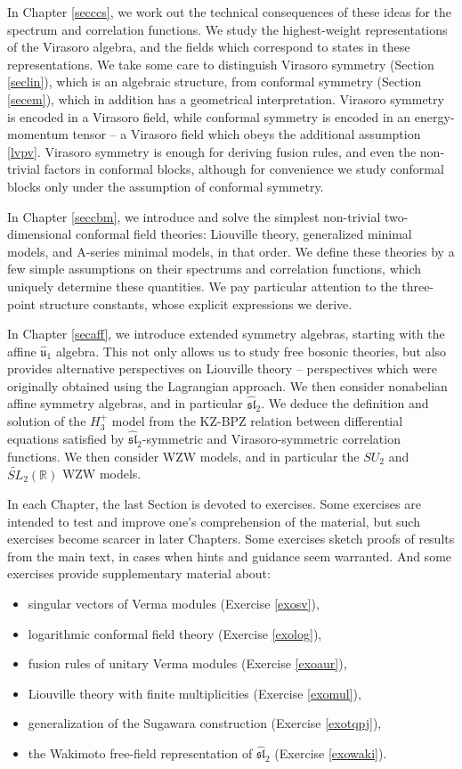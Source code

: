\documentclass[12pt, a4paper, notitlepage, twoside]{report}
\numberwithin{equation}{section}
\theoremstyle{break}
\begin{document}
In Chapter \ref{secccs}, we work out the technical consequences of these ideas for the spectrum and correlation functions.
We study the highest-weight representations of the Virasoro algebra, and the fields which correspond to states in these representations.
We take some care to distinguish Virasoro symmetry (Section \ref{seclin}), which is an algebraic structure, from conformal symmetry (Section \ref{secem}), which in addition has a geometrical interpretation.
Virasoro symmetry is encoded in a Virasoro field, while conformal symmetry is encoded in an energy-momentum tensor -- a Virasoro field which obeys the additional assumption \eqref{lvpv}.
Virasoro symmetry is enough for deriving fusion rules, and even the non-trivial factors in conformal blocks, although for convenience we study conformal blocks only under the assumption of conformal symmetry. 

In Chapter \ref{seccbm}, we introduce and solve the simplest non-trivial two-dimensional conformal field theories: Liouville theory, generalized minimal models, and A-series minimal models, in that order.
We define these theories by a few simple assumptions on their spectrums and correlation functions, which uniquely determine these quantities.
We pay particular attention to the three-point structure constants, whose explicit expressions we derive. 

In Chapter \ref{secaff}, we introduce extended symmetry algebras, starting with the affine $\hat{\mathfrak{u}}_1$ algebra.
This not only allows us to study free bosonic theories, but also provides alternative perspectives on Liouville theory -- perspectives which were originally obtained using the Lagrangian approach.
We then consider nonabelian affine symmetry algebras, and in particular $\widehat{\mathfrak{sl}}_2$.
We deduce the definition and solution of the $H_3^+$ model from the KZ-BPZ relation between differential equations satisfied by $\widehat{\mathfrak{sl}}_2$-symmetric and Virasoro-symmetric correlation functions.
We then consider WZW models, and in particular the $SU_2$ and $\widetilde{SL}_2(\mathbb{R})$ WZW models. 

In each Chapter, the last Section is devoted to exercises.
Some exercises are intended to test and improve one's comprehension of the material, but such exercises become scarcer in later Chapters.
Some exercises sketch proofs of results from the main text, in cases when hints and guidance seem warranted.
And some exercises provide supplementary material about: 
\begin{itemize}
 \item singular vectors of Verma modules (Exercise \ref{exosv}),
\item logarithmic conformal field theory (Exercise \ref{exolog}), 
\item fusion rules of unitary Verma modules (Exercise \ref{exoaur}), 
\item Liouville theory with finite multiplicities (Exercise \ref{exomul}),
\item generalization of the Sugawara construction (Exercise \ref{exotqpj}),
\item the Wakimoto free-field representation of $\widehat{\mathfrak{sl}}_2$ (Exercise \ref{exowaki}).
\end{itemize}
\end{document}
